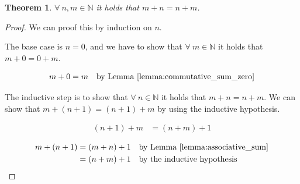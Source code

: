 \documentclass[a4paper]{article}
\newtheorem{theorem}{Theorem}
\begin{document}
\begin{theorem}\label{theorem:commutative_sum}
\(\forall \ n, m \in \mathbb{N}\) it holds that \(m + n = n + m\).
\end{theorem}

\begin{proof}
  We can proof this by induction on \(n\).

  The base case is \(n = 0\), and we have to show that \(\forall \ m \in \mathbb{N}\) it holds that \(m + 0 = 0 + m\).

  \begin{align*}
    m + 0 &= m \quad \text{by Lemma \ref{lemma:commutative_sum_zero}} \\
  \end{align*}

  The inductive step is to show that \(\forall \ n \in \mathbb{N}\) it holds that \(m + n = n + m\). We can show that \(m + (n + 1) = (n + 1) + m\) by using the inductive hypothesis.

  \begin{align*}
    (n + 1) + m &= (n + m) + 1
  \end{align*}

  \begin{align*}
    m + (n + 1) &= (m + n) + 1 \quad \text{by Lemma \ref{lemma:associative_sum}} \\
                &= (n + m) + 1 \quad \text{by the inductive hypothesis} \\
  \end{align*}

\end{proof}

% 
% 
% 
% 
% 
% 
% 
% 
% 
% 
% 
% 
% 
% 
% 
% 

\end{document}
